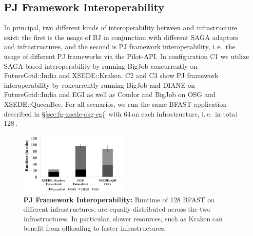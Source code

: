 \documentclass[conference]{IEEEtran}
\begin{document}



\subsection{PJ Framework Interoperability}
\label{sec:experiment-interop}

In principal, two different kinds of interoperability between
\pilotjobs and infrastructure exist: the first is the usage of BJ in
conjunction with different SAGA adaptors and infrastructures, and the
second is PJ framework interoperability, i.\,e.\ the usage of
different PJ frameworks via the Pilot-API. In configuration C1 we
utilize SAGA-based interoperability by running BigJob concurrently on
FutureGrid::India and XSEDE::Kraken. C2 and C3 show PJ
framework interoperability by concurrently running BigJob and DIANE on
FutureGrid::India and EGI as well as Condor and BigJob on OSG and
XSEDE::QueenBee. For all scenarios, we run the same BFAST application
described in \S\ref{sec:fg-xsede-osg-egi} with 64\,\cus on each
infrastructure, i.\,e.\ in total 128\,\cus.

\begin{figure}[htbp]
  	\centering
	\includegraphics[width=0.48\textwidth]{../perf/interop/128-bfast-interop.pdf}
	\caption{\textbf{PJ Framework Interoperability:} Runtime of
          128 BFAST \cus on different infrastructures. \cus are
          equally distributed across the two infrastructures. In
          particular, slower resources, such as Kraken can benefit
          from offloading \cus to faster infrastructures. }
	\label{fig:perf_interop_128-bfast-interop}
\end{figure}
\end{document}
